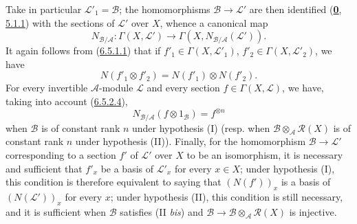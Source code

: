 \begin{env}[6.5.3]
Take in particular $\mathcal{L}'_1=\mathcal{B}$; the homomorphisms
$\mathcal{B}\to\mathcal{L}'$ are then identified
(\hyperref[0.5.1.1]{\textbf{0}, 5.1.1}) with the sections of $\mathcal{L}'$ over
$X$, whence a canonical map
\[
N_{\mathcal{B}/\mathcal{A}}:\Gamma(X,\mathcal{L}')
\to\Gamma(X,N_{\mathcal{B}/\mathcal{A}}(\mathcal{L}')).
\]
It again follows from (\hyperref[II.6.5.1.1]{6.5.1.1}) that if
$f'_1\in\Gamma(X,\mathcal{L}'_1)$, $f'_2\in\Gamma(X,\mathcal{L}'_2)$, we
have
\[
\label{II.6.5.3.1}
N(f'_1\otimes f'_2)=N(f'_1)\otimes N(f'_2).
\tag{6.5.3.1}
\]
For every invertible $\mathcal{A}$-module $\mathcal{L}$ and every section
$f\in\Gamma(X,\mathcal{L})$, we have, taking into account
(\hyperref[II.6.5.2.4]{6.5.2.4}),
\[
\label{II.6.5.3.2}
N_{\mathcal{B}/\mathcal{A}}(f\otimes1_{\mathcal{B}})=f^{\otimes n}
\tag{6.5.3.2}
\]
when $\mathcal{B}$ is of constant rank $n$ under hypothesis (I) (resp. when
$\mathcal{B}\otimes_{\mathcal{A}}\mathcal{R}(X)$ is of constant rank $n$
under hypothesis (II)). Finally, for the homomorphism
$\mathcal{B}\to\mathcal{L}'$ corresponding to a section $f'$ of
$\mathcal{L}'$ over $X$ to be an isomorphism, it is necessary and sufficient
that $f'_x$ be a basis of $\mathcal{L}'_x$ for every $x\in X$; under
hypothesis (I), this condition is therefore equivalent to saying that
$(N(f'))_x$ is a basis of $(N(\mathcal{L}'))_x$ for every $x$; under
hypothesis (II), this condition is still necessary, and it is sufficient
when $\mathcal{B}$ satisfies (II \emph{bis}) and
$\mathcal{B}\to\mathcal{B}\otimes_{\mathcal{A}}\mathcal{R}(X)$ is injective.
\end{env}


